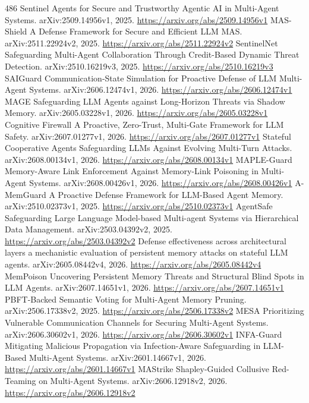 \documentclass[11pt]{article}
\begin{document}
\begin{thebibliography}{486}
 Sentinel Agents for Secure and Trustworthy Agentic AI in Multi-Agent Systems. arXiv:2509.14956v1, 2025. \url{https://arxiv.org/abs/2509.14956v1}
 MAS-Shield A Defense Framework for Secure and Efficient LLM MAS. arXiv:2511.22924v2, 2025. \url{https://arxiv.org/abs/2511.22924v2}
 SentinelNet Safeguarding Multi-Agent Collaboration Through Credit-Based Dynamic Threat Detection. arXiv:2510.16219v3, 2025. \url{https://arxiv.org/abs/2510.16219v3}
 SAIGuard Communication-State Simulation for Proactive Defense of LLM Multi-Agent Systems. arXiv:2606.12474v1, 2026. \url{https://arxiv.org/abs/2606.12474v1}
 MAGE Safeguarding LLM Agents against Long-Horizon Threats via Shadow Memory. arXiv:2605.03228v1, 2026. \url{https://arxiv.org/abs/2605.03228v1}
 Cognitive Firewall A Proactive, Zero-Trust, Multi-Gate Framework for LLM Safety. arXiv:2607.01277v1, 2026. \url{https://arxiv.org/abs/2607.01277v1}
 Stateful Cooperative Agents Safeguarding LLMs Against Evolving Multi-Turn Attacks. arXiv:2608.00134v1, 2026. \url{https://arxiv.org/abs/2608.00134v1}
 MAPLE-Guard Memory-Aware Link Enforcement Against Memory-Link Poisoning in Multi-Agent Systems. arXiv:2608.00426v1, 2026. \url{https://arxiv.org/abs/2608.00426v1}
 A-MemGuard A Proactive Defense Framework for LLM-Based Agent Memory. arXiv:2510.02373v1, 2025. \url{https://arxiv.org/abs/2510.02373v1}
 AgentSafe Safeguarding Large Language Model-based Multi-agent Systems via Hierarchical Data Management. arXiv:2503.04392v2, 2025. \url{https://arxiv.org/abs/2503.04392v2}
 Defense effectiveness across architectural layers a mechanistic evaluation of persistent memory attacks on stateful LLM agents. arXiv:2605.08442v4, 2026. \url{https://arxiv.org/abs/2605.08442v4}
 MemPoison Uncovering Persistent Memory Threats and Structural Blind Spots in LLM Agents. arXiv:2607.14651v1, 2026. \url{https://arxiv.org/abs/2607.14651v1}
 PBFT-Backed Semantic Voting for Multi-Agent Memory Pruning. arXiv:2506.17338v2, 2025. \url{https://arxiv.org/abs/2506.17338v2}
 MESA Prioritizing Vulnerable Communication Channels for Securing Multi-Agent Systems. arXiv:2606.30602v1, 2026. \url{https://arxiv.org/abs/2606.30602v1}
 INFA-Guard Mitigating Malicious Propagation via Infection-Aware Safeguarding in LLM-Based Multi-Agent Systems. arXiv:2601.14667v1, 2026. \url{https://arxiv.org/abs/2601.14667v1}
 MAStrike Shapley-Guided Collusive Red-Teaming on Multi-Agent Systems. arXiv:2606.12918v2, 2026. \url{https://arxiv.org/abs/2606.12918v2}

\end{thebibliography}
\end{document}
